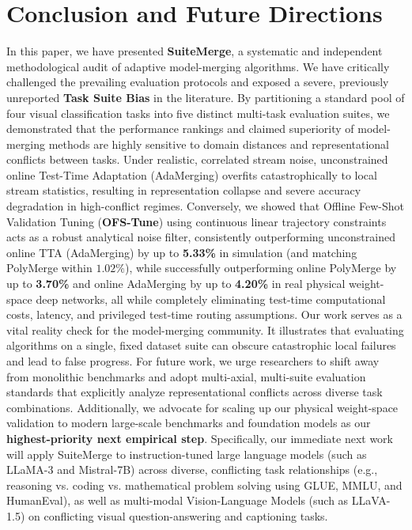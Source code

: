 \section{Conclusion and Future Directions}
\label{sec:conclusion}

In this paper, we have presented \textbf{SuiteMerge}, a systematic and
independent methodological audit of adaptive model-merging algorithms.
We have critically challenged
the prevailing evaluation protocols and exposed a severe, previously unreported
\textbf{Task Suite Bias} in the literature.
By partitioning a standard pool of four visual classification tasks into five
distinct multi-task evaluation suites, we demonstrated that the performance
rankings and claimed superiority of model-merging methods are highly sensitive
to domain distances and representational conflicts between tasks.
Under
realistic, correlated stream noise, unconstrained online Test-Time Adaptation
(AdaMerging) overfits catastrophically to local stream statistics, resulting in
representation collapse and severe accuracy degradation in high-conflict
regimes.
Conversely, we showed that Offline Few-Shot Validation Tuning
(\textbf{OFS-Tune}) using continuous linear trajectory constraints acts as a
robust analytical noise filter, consistently outperforming unconstrained online
TTA (AdaMerging) by up to \textbf{5.33\%} in simulation (and matching PolyMerge
within $1.02\%$), while successfully outperforming online PolyMerge by up to
\textbf{3.70\%} and online AdaMerging by up to \textbf{4.20\%} in real physical
weight-space deep networks, all while completely eliminating test-time
computational costs, latency, and privileged test-time routing assumptions.
Our work serves as a vital reality check for the model-merging community.
It
illustrates that evaluating algorithms on a single, fixed dataset suite can
obscure catastrophic local failures and lead to false progress.
For future work,
we urge researchers to shift away from monolithic benchmarks and adopt
multi-axial, multi-suite evaluation standards that explicitly analyze
representational conflicts across diverse task combinations.
Additionally, we advocate for scaling up our physical weight-space validation to modern large-scale benchmarks and foundation models as our \textbf{highest-priority next empirical step}.
Specifically, our immediate next work will apply SuiteMerge to instruction-tuned large language models (such as LLaMA-3 and Mistral-7B) across diverse, conflicting task relationships (e.g., reasoning vs.
coding vs.
mathematical problem solving using GLUE, MMLU, and HumanEval), as well as multi-modal Vision-Language Models (such as LLaVA-1.5) on conflicting visual question-answering and captioning tasks.
